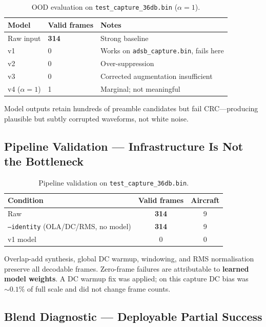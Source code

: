 \documentclass[11pt,a4paper]{article}
\begin{document}
\begin{table}[htbp]
  \centering
  \caption{OOD evaluation on \texttt{test\_capture\_36db.bin} ($\alpha=1$).}
  \label{tab:ood}
  \begin{tabular}{@{}lll@{}}
    \toprule
    Model & Valid frames & Notes \\
    \midrule
    Raw input & \textbf{314} & Strong baseline \\
    v1 & 0 & Works on \texttt{adsb\_capture.bin}, fails here \\
    v2 & 0 & Over-suppression \\
    v3 & 0 & Corrected augmentation insufficient \\
    v4 ($\alpha=1$) & 1 & Marginal; not meaningful \\
    \bottomrule
  \end{tabular}
\end{table}

Model outputs retain hundreds of preamble candidates but fail CRC---producing
plausible but subtly corrupted waveforms, not white noise.

\subsection{Pipeline Validation --- Infrastructure Is Not the Bottleneck}

\begin{table}[htbp]
  \centering
  \caption{Pipeline validation on \texttt{test\_capture\_36db.bin}.}
  \label{tab:pipeline-validation}
  \begin{tabular}{@{}lcc@{}}
    \toprule
    Condition & Valid frames & Aircraft \\
    \midrule
    Raw & \textbf{314} & 9 \\
    \texttt{--identity} (OLA/DC/RMS, no model) & \textbf{314} & 9 \\
    v1 model & 0 & 0 \\
    \bottomrule
  \end{tabular}
\end{table}

Overlap-add synthesis, global DC warmup, windowing, and RMS normalisation
preserve all decodable frames. Zero-frame failures are attributable to
\textbf{learned model weights}. A DC warmup fix was applied; on this capture DC
bias was ${\sim}0.1\%$ of full scale and did not change frame counts.

\subsection{Blend Diagnostic --- Deployable Partial Success}
\label{sec:blend}
\end{document}
